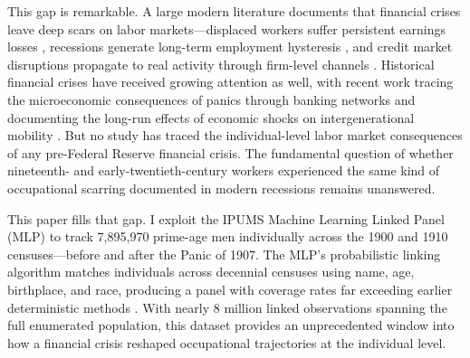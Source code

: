 \documentclass[12pt]{article}
\begin{document}
This gap is remarkable. A large modern literature documents that financial crises leave deep scars on labor markets---displaced workers suffer persistent earnings losses \citep{jacobson1993earnings, davis2011recessions}, recessions generate long-term employment hysteresis \citep{yagan2019employment}, and credit market disruptions propagate to real activity through firm-level channels \citep{chodorow2014effects, mian2014house}. Historical financial crises have received growing attention as well, with recent work tracing the microeconomic consequences of panics through banking networks \citep{calomiris1991origins, hilt2023banks, frydman2023panic} and documenting the long-run effects of economic shocks on intergenerational mobility \citep{feigenbaum2018intergenerational, bleakley2010shocking}. But no study has traced the individual-level labor market consequences of any pre-Federal Reserve financial crisis. The fundamental question of whether nineteenth- and early-twentieth-century workers experienced the same kind of occupational scarring documented in modern recessions remains unanswered.

This paper fills that gap. I exploit the IPUMS Machine Learning Linked Panel (MLP) to track 7,895,970 prime-age men individually across the 1900 and 1910 censuses---before and after the Panic of 1907. The MLP's probabilistic linking algorithm matches individuals across decennial censuses using name, age, birthplace, and race, producing a panel with coverage rates far exceeding earlier deterministic methods \citep{abramitzky2021automated, ruggles2021ipums}. With nearly 8 million linked observations spanning the full enumerated population, this dataset provides an unprecedented window into how a financial crisis reshaped occupational trajectories at the individual level.
\end{document}

